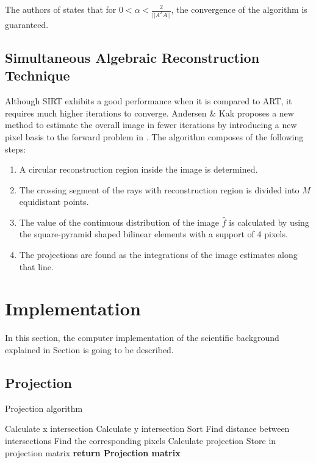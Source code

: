 \documentclass[journal]{IEEEtran}
\begin{document}
The authors of \cite*{dong2020accelerated} states that for $0<\alpha<\frac{2}{||A^TA||}$, the convergence of the algorithm is guaranteed. 

\subsection{Simultaneous Algebraic Reconstruction Technique}

Although SIRT exhibits a good performance when it is compared to ART, it requires much higher iterations to converge. Andersen \& Kak proposes a new method to estimate the overall image in fewer iterations by introducing a new pixel basis to the forward problem in \cite*{andersen1984sart}. The algorithm composes of the following steps:
\begin{enumerate}
	\item A circular reconstruction region inside the image is determined. 
	\item The crossing segment of the rays with reconstruction region is divided into $M$ equidistant points.
	\item The value of the continuous distribution of the image $\hat{f}$ is calculated by using the square-pyramid shaped bilinear elements with a support of 4 pixels.
	\item The projections are found as the integrations of the image estimates along that line. 
\end{enumerate}

\section{Implementation} \label{sec:implementation}

In this section, the computer implementation of the scientific background explained in Section  is going to be described.

\subsection{Projection}
\begin{algorithm}[h]
\caption{Projection algorithm}
\begin{algorithmic}
		\State Calculate x intersection
		\State Calculate y intersection
		\State Sort 
		\State Find distance between intersections 
		\State Find the corresponding pixels
		\State Calculate projection 
		\State Store in projection matrix
	  \EndFor
   \EndFor
   \State \textbf{return Projection matrix}
\EndProcedure
\label{alg:projection}
\end{algorithmic}
\end{algorithm}
\end{document}

